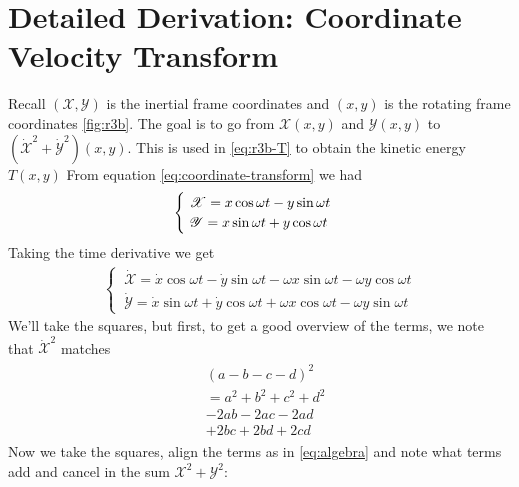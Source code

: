 \chapter{Detailed Derivation: Coordinate Velocity Transform} \label{app:coordinate-transform}
Recall $(\mathscr{X},\mathscr{Y})$ is the inertial frame coordinates and $(x,y)$ is the rotating frame coordinates \ref{fig:r3b}. The goal is to go from $\mathscr{X}(x,y)$ and $\mathscr{Y}(x,y)$ to $(\dot{\mathscr{X}}^2 + \dot{\mathscr{Y}}^2)(x,y)$. This is used in \eqref{eq:r3b-T} to obtain the kinetic energy $T(x,y)$ From equation \eqref{eq:coordinate-transform} we had
\begin{align}
\notag
\begin{cases}
\ \mathscr{X} = x\cos{\omega t} - y\sin{\omega t} \\
\ \mathscr{Y} = x\sin{\omega t} + y\cos{\omega t}
\end{cases}
\end{align}
Taking the time derivative we get
\begin{align}
\begin{cases}
\ \dot{\mathscr{X}} = \dot{x}\cos{\omega t} - \dot{y}\sin{\omega t} - \omega x\sin{\omega t} - \omega y\cos{\omega t} \\
\ \dot{\mathscr{Y}} = \dot{x}\sin{\omega t} + \dot{y}\cos{\omega t} + \omega x\cos{\omega t} - \omega y\sin{\omega t}
\end{cases}
\end{align}
We'll take the squares, but first, to get a good overview of the terms, we note that $\dot{\mathscr{X}}^2$ matches
\begin{align}
\begin{split}
\label{eq:algebra}
&(a-b-c-d)^2 \\
&= a^2 + b^2 +c^2 +d^2 \\
&- 2 a b -2 a c - 2 a d \\
&+ 2 b c + 2 b d + 2 c d
\end{split}
\end{align}
Now we take the squares, align the terms as in \eqref{eq:algebra} and note what terms add and cancel in the sum $\mathscr{X}^2 + \mathscr{Y}^2$:
